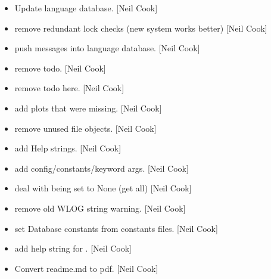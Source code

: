 \documentclass[a4paper,10pt,english]{report}
\begin{document}
\begin{itemize}
\item {} 
Update language database. {[}Neil Cook{]}

\item {} 
 \sphinxhyphen{} remove redundant lock checks (new system works
better) {[}Neil Cook{]}

\item {} 
 \sphinxhyphen{} push messages into language database. {[}Neil Cook{]}

\item {} 
 \sphinxhyphen{} remove todo. {[}Neil Cook{]}

\item {} 
 \sphinxhyphen{} remove todo here. {[}Neil Cook{]}

\item {} 
 \sphinxhyphen{} add plots that were
missing. {[}Neil Cook{]}

\item {} 
 \sphinxhyphen{} remove unused file
objects. {[}Neil Cook{]}

\item {} 
 \sphinxhyphen{} add Help strings.
{[}Neil Cook{]}

\item {} 
 \sphinxhyphen{} add config/constants/keyword args.
{[}Neil Cook{]}

\item {} 
 \sphinxhyphen{} deal with  being set to None
(get all) {[}Neil Cook{]}

\item {} 
 \sphinxhyphen{} remove old WLOG string warning. {[}Neil Cook{]}

\item {} 
 \sphinxhyphen{} set Database constants from constants
files. {[}Neil Cook{]}

\item {} 
 \sphinxhyphen{} add help string for . {[}Neil Cook{]}

\item {} 
Convert readme.md to pdf. {[}Neil Cook{]}


\end{itemize}
\end{document}
